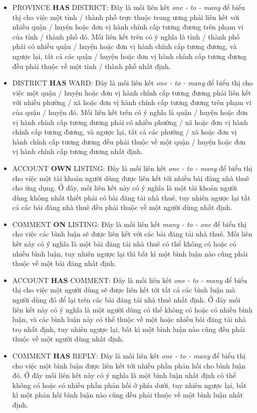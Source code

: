 \begin{itemize}
    \item PROVINCE \textbf{HAS} DISTRICT: Đây là mối liên kết \textit{one - to - many} để biểu thị cho việc một tỉnh / thành phố trực thuộc trung ương phải liên kết với nhiều quận / huyện hoặc đơn vị hành chính cấp tương đương trên phạm vi của tỉnh / thành phố đó. Mối liên kết trên có ý nghĩa là tỉnh / thành phố phải có nhiều quận / huyện hoặc đơn vị hành chính cấp tương đương, và ngược lại, tất cả các quận / huyện hoặc đơn vị hành chính cấp tương đương đều phải thuộc về một tỉnh / thành phố nhất định.
    \item DISTRICT \textbf{HAS} WARD: Đây là mối liên kết \textit{one - to - many} để biểu thị cho việc một quận / huyện hoặc đơn vị hành chính cấp tương đương phải liên kết với nhiều phường / xã hoặc đơn vị hành chính cấp tương đương trên phạm vi của quận / huyện đó. Mối liên kết trên có ý nghĩa là quận / huyện hoặc đơn vị hành chính cấp tương đương phải có nhiều phường / xã hoặc đơn vị hành chính cấp tương đương, và ngược lại, tất cả các phường / xã hoặc đơn vị hành chính cấp tương đương đều phải thuộc về một quận / huyện hoặc đơn vị hành chính cấp tương đương nhất định.
    \item ACCOUNT \textbf{OWN} LISTING: Đây là mối liên kết \textit{one - to - many} để biểu thị cho việc một tài khoản người dùng được liên kết tới nhiều bài đăng nhà thuê cho ứng dụng. Ở đây, mối liên kết này có ý nghĩa là một tài khoản người dùng không nhất thiết phải có bài đăng tải nhà thuê, tuy nhiên ngược lại tất cả các bài đăng nhà thuê đều phải thuộc về một người dùng nhất định.
    \item COMMENT \textbf{ON} LISTING: Đây là mối liên kết \textit{many - to - one} để biểu thị cho việc các bình luận sẽ được liên kết với các bài đăng tải nhà thuê. Mối liên kết này có ý nghĩa là một bài đăng tải nhà thuê có thể không có hoặc có nhiều bình luận, tuy nhiên ngược lại thì bất kì một bình luận nào cũng phải thuộc về một bài đăng nhất định.
    \item ACCOUNT \textbf{HAS} COMMENT: Đây là mối liên kết \textit{one - to - many} để biểu thị cho việc một người dùng sẽ được liên kết tới tất cả các bình luận mà người dùng đó để lại trên các bài đăng tải nhà thuê nhất định. Ở đây mối liên kết này có ý nghĩa là một người dùng có thể không có hoặc có nhiều bình luận, và các bình luận này có thể thuộc về một hoặc nhiều bài đăng tải nhà trọ nhất định, tuy nhiên ngược lại, bất kì một bình luận nào cũng đều phải thuộc về một người dùng nhất định.
    \item COMMENT \textbf{HAS} REPLY: Đây là mối liên kết \textit{one - to - many} để biểu thị cho việc một bình luận được liên kết tới nhiều phần phản hồi cho bình luận đó. Ở đây mối liên kết này có ý nghĩa là một bình luận nhất định có thể không có hoặc có nhiều phần phản hồi ở phía dưới, tuy nhiên ngược lại, bất kì một phản hồi bình luận nào cũng đều phải thuộc về một bình luận nhất định.

\end{itemize}
